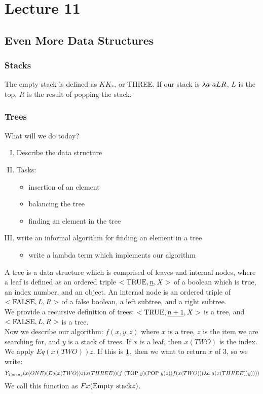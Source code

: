 \chapter{Lecture 11}
\pagestyle{fancy}

\section{Even More Data Structures}

\subsection{Stacks}
The empty stack is defined as $KK_*$, or THREE. If our stack is $\lambda a\ aLR$, $L$ is the top, $R$ is the result of popping the stack.

\subsection{Trees}
What will we do today?
\begin{enumerate}[(I)]
  \item Describe the data structure
  \item Tasks:
    \begin{itemize}
      \item insertion of an element
      \item balancing the tree
      \item finding an element in the tree
    \end{itemize}
  \item write an informal algorithm for finding an element in a tree
    \begin{itemize}
      \item write a lambda term which implements our algorithm
    \end{itemize}
\end{enumerate}

A tree is a data structure which is comprised of leaves and internal nodes, where a leaf is defined as an ordered triple $<\hbox{TRUE}, \uline{n}, X>$ of a boolean which is true, an index number, and an object. An internal node is an ordered triple of $<\hbox{FALSE}, L, R>$ of a false boolean, a left subtree, and a right subtree.\\

We provide a recursive definition of trees: $<\hbox{TRUE}, \uline{n+1}, X>$ is a tree, and $<\hbox{FALSE}, L, R>$ is a tree.\\

Now we describe our algorithm: $f(x,y,z)$ where $x$ is a tree, $z$ is the item we are searching for, and $y$ is a stack of trees. If $x$ is a leaf, then $x(TWO)$ is the index. We apply $Eq(x(TWO))z$. If this is $\uline{1}$, then we want to return $x$ of 3, so we write:
\begin{equation*}
  Y_{Turing}(x(ONE)(Eq(x(TWO))z(x(THREE))(f\ (\hbox{TOP }y)(\hbox{POP }y)z)(f (x(TWO))(\l a\ a(x(THREE))y))))
\end{equation*}
We call this function as $Fx(\hbox{Empty stack}z)$.\\